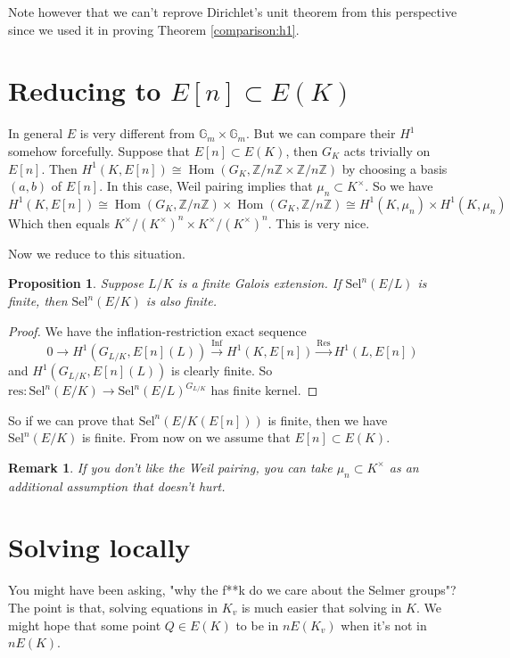 \documentclass{article}
\newtheorem{rmk}[thm]{Remark}
\newtheorem{prop}[thm]{Proposition}
\newcommand{\mn}{\mu_{n}}
\newcommand{\kmkn}{K ^{\times} / (K ^{\times})^{n}}
\DeclareMathOperator{\hhom}{Hom}
\begin{document}
Note however that we can't reprove Dirichlet's unit theorem from this perspective
since we used it in proving Theorem \ref{comparison:h1}.

\section{Reducing to $ E [n]\subset E (K) $}

In general $ E $ is very different from $ \mathbb{G}_{m}\times \mathbb{G}_{m} $.
But we can compare their $ H ^{1} $ somehow forcefully.
Suppose that $ E [n] \subset E (K) $, then $ G _{K} $ acts trivially on $ E [n] $.
Then $ H ^{1}(K, E [n]) \cong \hhom (G _{K}, \mathbb{Z}/n \mathbb{Z} \times \mathbb{Z}/n \mathbb{Z})$
by choosing a basis $ (a, b) $ of $ E [n] $.
In this case, Weil pairing implies that $ \mn \subset K ^{\times} $.
So we have
$$ H ^{1}(K, E [n]) \cong \hhom (G _{K}, \mathbb{Z}/n \mathbb{Z})\times
\hhom (G _{K}, \mathbb{Z}/n \mathbb{Z})\cong H ^{1}(K, \mn)\times H ^{1}(K, \mn)
$$
Which then equals $ \kmkn\times \kmkn $.
This is very nice.

Now we reduce to this situation.
\begin{prop}
Suppose $ L/K $ is a finite Galois extension.
If $ \mathrm{Sel}^{n}(E/L) $ is finite, then
$ \mathrm{Sel}^{n}(E/K) $ is also finite.
\end{prop}

\begin{proof}
We have the inflation-restriction exact sequence
$$ 0\to H ^{1}(G _{L/K}, E [n](L))\xrightarrow{\mathrm{Inf}}
H ^{1}(K, E [n]) \xrightarrow{\mathrm{Res}}
H ^{1}(L, E [n])$$
and $ H ^{1}(G _{L/K}, E [n](L)) $ is clearly finite.
So $ \mathrm{res}: \mathrm{Sel}^{n}(E/K)\to \mathrm{Sel}^{n}(E/L)^{G _{L/K}} $
has finite kernel.
\end{proof}

So if we can prove that $ \mathrm{Sel}^{n}(E/K (E [n])) $ is finite,
then we have $ \mathrm{Sel}^{n}(E/K) $ is finite.
From now on we assume that $ E [n]\subset E (K) $.
\begin{rmk}
If you don't like the Weil pairing, you can take $ \mn \subset K ^{\times} $ as an
additional assumption that doesn't hurt.
\end{rmk}

\section{Solving locally}

You might have been asking,
"why the f**k do we care about the Selmer groups"?
The point is that, solving equations in $ K _{v} $ is much easier that
solving in $ K $.
We might hope that some point $ Q \in E (K)$ to be in $ nE (K _{v}) $ when it's not in $ n E (K) $.
\end{document}
